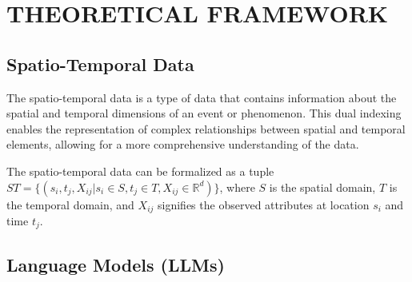 
\chapter{THEORETICAL FRAMEWORK}


\section{Spatio-Temporal Data}

The spatio-temporal data is a type of data that contains information about the spatial and temporal dimensions of an event or phenomenon. 
This dual indexing enables the representation of complex relationships between spatial and temporal elements, allowing for a more comprehensive understanding of the data.

The spatio-temporal data can be formalized as a tuple $ST = \{ (s_i, t_j, X_{ij} | s_i \in S , t_j \in T , X_{ij} \in \mathbb{R}^d )\}$, where $S$ is the spatial domain, $T$ is the temporal domain, and $X_{ij}$ signifies the observed attributes at location $s_i$ and time $t_j$.
 













\section{Language Models (LLMs)}

